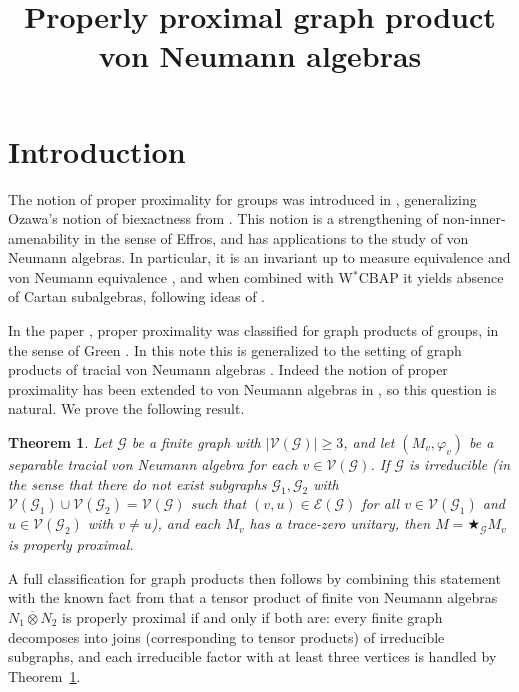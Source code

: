 \documentclass[a4paper, 11pt, reqno]{amsart}
\numberwithin{equation}{section}
\theoremstyle{plain}
\newtheorem{thm}{Theorem}[section]
\theoremstyle{remark}
\theoremstyle{definition}
\newcommand{\VV}{{\mathcal V}}
\newcommand{\EE}{{\mathcal E}}
\newcommand{\GG}{{\mathcal G}}
\begin{document}
\title[Properly proximal graph product von Neumann algebras]{Properly proximal graph product von Neumann algebras}
\maketitle

\section{Introduction}

The notion of proper proximality for groups was introduced in \cite{BIP21}, generalizing Ozawa's notion of biexactness from \cite{Oza04}. This notion is a strengthening of non-inner-amenability in the sense of Effros, and has applications to the study of von Neumann algebras. In particular, it is an invariant up to measure equivalence and von Neumann equivalence \cite{IsPeRu19}, and when combined with W$^*$CBAP it yields absence of Cartan subalgebras, following ideas of \cite{OzPo10a}.

In the paper \cite{DKE24properproximalgroups}, proper proximality was classified for graph products of groups, in the sense of Green \cite{Gr90}. In this note this is generalized to the setting of graph products of tracial von Neumann algebras \cite{CaFi17}. Indeed the notion of proper proximality has been extended to von Neumann algebras in \cite{DKEP23}, so this question is natural. We prove the following result.

\begin{thm}\label{thm:main}
Let $\GG$ be a finite graph with $|\VV(\GG)|\geq 3$, and let $(M_v,\varphi_v)$ be a separable tracial von Neumann algebra for each $v\in\VV(\GG)$. If $\GG$ is irreducible (in the sense that there do not exist subgraphs $\GG_1,\GG_2$ with $\VV(\GG_1)\cup\VV(\GG_2)=\VV(\GG)$ such that $(v,u)\in\EE(\GG)$ for all $v\in\VV(\GG_1)$ and $u\in\VV(\GG_2)$ with $v\neq u$), and each $M_v$ has a trace-zero unitary, then $M=\bigstar_{\GG}M_v$ is properly proximal.
\end{thm}

A full classification for graph products then follows by combining this statement with the known fact from \cite{DKEP23} that a tensor product of finite von Neumann algebras $N_1\overline{\otimes}N_2$ is properly proximal if and only if both are: every finite graph decomposes into joins (corresponding to tensor products) of irreducible subgraphs, and each irreducible factor with at least three vertices is handled by Theorem~\ref{thm:main}.
\end{document}
